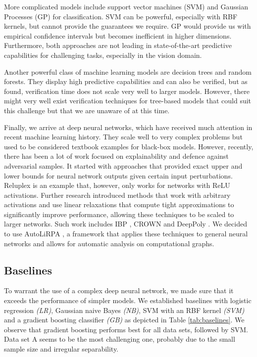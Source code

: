 \documentclass[acmsmall,nonacm]{acmart}
\begin{document}
More complicated models include support vector machines (SVM) and Gaussian Processes (GP) for classification. SVM can be powerful, especially with RBF kernels, but cannot provide the guarantees we require. GP would provide us with empirical confidence intervals but becomes inefficient in higher dimensions. Furthermore, both approaches are not leading in state-of-the-art predictive capabilities for challenging tasks, especially in the vision domain.

Another powerful class of machine learning models are decision trees and random forests. They display high predictive capabilities and can also be verified, but as \cite{tornblom2018formal} found, verification time does not scale very well to larger models. However, there might very well exist verification techniques for tree-based models that could suit this challenge but that we are unaware of at this time.

Finally, we arrive at deep neural networks, which have received much attention in recent machine learning history. They scale well to very complex problems but used to be considered textbook examples for black-box models. However, recently, there has been a lot of work focused on explainability and defence against adversarial samples. It started with approaches that provided exact upper and lower bounds for neural network outputs given certain input perturbations. Reluplex \cite{katz2017reluplex} is an example that, however, only works for networks with ReLU activations. Further research introduced methods that work with arbitrary activations and use linear relaxations that compute tight approximations to significantly improve performance, allowing these techniques to be scaled to larger networks. Such work includes IBP \cite{gowal2019effectivenessIBP}, CROWN \cite{zhang2018efficient} and DeepPoly \cite{singh2019abstractDeepPoly}. We decided to use AutoLiRPA \cite{xu2020autoLiRPA}, a framework that applies these techniques to general neural networks and allows for automatic analysis on computational graphs.

\subsection{Baselines} \label{ssec:baselines}

To warrant the use of a complex deep neural network, we made sure that it exceeds the performance of simpler models. We established baselines with logistic regression \textit{(LR)}, Gaussian naive Bayes \textit{(NB)}, SVM with an RBF kernel \textit{(SVM)} and a gradient boosting classifier \textit{(GB)} as depicted in Table \ref{tab:baselines}. We observe that gradient boosting performs best for all data sets, followed by SVM. Data set A seems to be the most challenging one, probably due to the small sample size and irregular separability.
\end{document}
